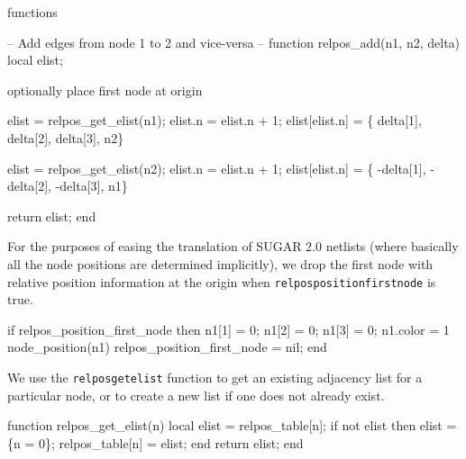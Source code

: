 \LA{}functions~{\nwtagstyle{}}\RA{}
\nwendcode{}\nwdocspar


\nwenddocs{}\endmoddef
-- Add edges from node 1 to 2 and vice-versa
--
function relpos_add(n1, n2, delta)
  local elist;

  \LA{}optionally place first node at origin~{\nwtagstyle{}}\RA{}

  elist = relpos_get_elist(n1);
  elist.n = elist.n + 1;
  elist[elist.n] = \{  delta[1],  delta[2],  delta[3], n2\}

  elist = relpos_get_elist(n2);
  elist.n = elist.n + 1;
  elist[elist.n] = \{ -delta[1], -delta[2], -delta[3], n1\}

  return elist;
end

\nwendcode{}\nwdocspar

For the purposes of easing the translation of SUGAR 2.0 netlists
(where basically all the node positions are determined implicitly),
we drop the first node with relative position information at
the origin when {\tt{}relpos{}position{}first{}node} is true.

\nwenddocs{}\endmoddef
if relpos_position_first_node then
  n1[1] = 0;
  n1[2] = 0;
  n1[3] = 0;
  n1.color = 1
  node_position(n1)
  relpos_position_first_node = nil;
end
\nwendcode{}\nwdocspar

We use the {\tt{}relpos{}get{}elist} function to get an existing
adjacency list for a particular node, or to create a new list
if one does not already exist.

\nwenddocs{}\plusendmoddef
function relpos_get_elist(n)
  local elist = relpos_table[n];
  if not elist then
    elist = \{n = 0\};
    relpos_table[n] = elist;
  end
  return elist;
end

